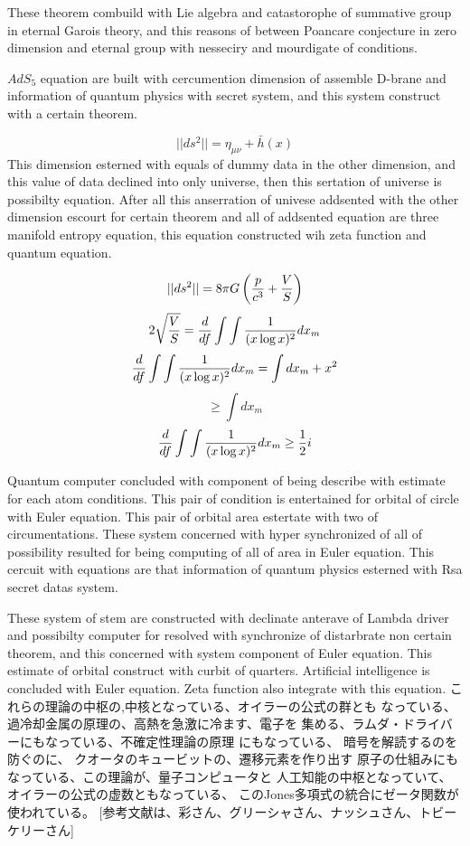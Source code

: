 \documentclass{jsarticle}
\begin{document}
   These theorem combuild with Lie algebra and catastorophe  
   of summative group in eternal Garois theory,
   and this reasons of between Poancare conjecture in zero dimension 
   and eternal group with nesseciry and mourdigate of conditions.


   $ AdS_5 $ equation are built with cercumention dimension of assemble
   D-brane and information of quantum physics with secret system,
   and this system construct with a certain theorem.

   $$ ||ds^2|| = \eta_{\mu\nu} + \bar{h}(x) $$ 
   This dimension esterned with equals of dummy data in the other dimension,
   and this value of data declined into only universe,
   then this sertation of universe is possibilty equation.
   After all this anserration of univese addsented with the other dimension
   escourt for certain theorem and all of addsented equation
   are three manifold entropy equation,
   this equation constructed wih zeta function and quantum equation.

   $$ ||ds^2|| = 8 \pi G \left({p \over c^3} + {V \over S}\right) $$
   $$ 2 \sqrt{V \over S}= {d \over df}\int \int{1 \over (x \log x)^2}dx_m $$
   $$ {d \over df} \int \int{ 1 \over (x \log x)^2}dx_m = \int dx_m + x^2 $$
   $$ \ge \int dx_m $$
   $$ {d \over df} \int \int{1 \over (x \log x)^2}dx_m \ge {1 \over 2}i $$

     Quantum computer concluded with component of being describe with 
     estimate for each atom conditions. This pair of condition is
     entertained for orbital of circle with Euler equation.
     This pair of orbital area estertate with two of circumentations.
     These system concerned with hyper synchronized of all of possibility
     resulted for being computing of all of area in Euler equation.
     This cercuit with equations are that information of quantum physics
     esterned with Rsa secret datas system.


     These system of stem are constructed with declinate anterave of
     Lambda driver and possibilty computer for resolved with synchronize
     of distarbrate non certain theorem, and this concerned with
     system component of Euler equation.
     This estimate of orbital construct with curbit of quarters.
     Artificial intelligence is concluded with Euler equation.
     Zeta function also integrate with this equation.
     これらの理論の中枢の,中核となっている、オイラーの公式の群とも
     なっている、過冷却金属の原理の、高熱を急激に冷ます、電子を
     集める、ラムダ・ドライバーにもなっている、不確定性理論の原理
     にもなっている、 暗号を解読するのを防ぐのに、
     クオータのキュービットの、遷移元素を作り出す
     原子の仕組みにもなっている、この理論が、量子コンピュータと
     人工知能の中枢となっていて、オイラーの公式の虚数ともなっている、
     このJones多項式の統合にゼータ関数が使われている。
     [参考文献は、彩さん、グリーシャさん、ナッシュさん、トビーケリーさん]
\end{document}
